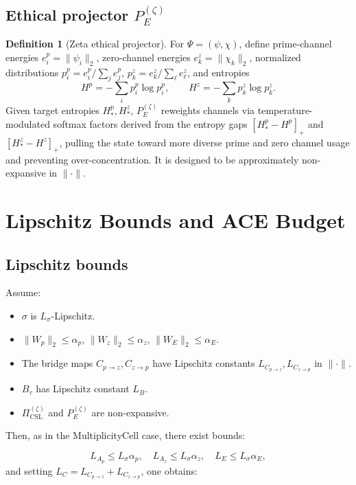 \documentclass[11pt]{article}
\theoremstyle{definition}
\newtheorem{definition}{Definition}
\theoremstyle{plain}
\begin{document}
\subsection{Ethical projector \texorpdfstring{$P_E^{(\zeta)}$}{PEz}}

\begin{definition}[Zeta ethical projector]
For $\Psi=(\psi,\chi)$, define prime-channel energies $e_i^p = \|\psi_i\|_2$, zero-channel energies $e_k^z = \|\chi_k\|_2$, normalized distributions $p^p_i = e_i^p / \sum_j e_j^p$, $p^z_k = e_k^z / \sum_\ell e_\ell^z$, and entropies
\[
  H^p = -\sum_i p^p_i \log p^p_i,
  \qquad
  H^z = -\sum_k p^z_k \log p^z_k.
\]
Given target entropies $H_\ast^p,H_\ast^z$, $P_E^{(\zeta)}$ reweights channels via temperature-modulated softmax factors derived from the entropy gaps $[H_\ast^p-H^p]_+$ and $[H_\ast^z-H^z]_+$, pulling the state toward more diverse prime and zero channel usage and preventing over-concentration.
It is designed to be approximately non-expansive in $\|\cdot\|$.
\end{definition}

\section{Lipschitz Bounds and ACE Budget}

\subsection{Lipschitz bounds}

Assume:

\begin{itemize}[leftmargin=*]
  \item $\sigma$ is $L_\sigma$-Lipschitz.
  \item $\|W_p\|_2 \le \alpha_p$, $\|W_z\|_2 \le \alpha_z$, $\|W_E\|_2 \le \alpha_E$.
  \item The bridge maps $C_{p\to z},C_{z\to p}$ have Lipschitz constants $L_{C_{p\to z}},L_{C_{z\to p}}$ in $\|\cdot\|$.
  \item $B_\tau$ has Lipschitz constant $L_B$.
  \item $\Pi_{\mathrm{CSL}}^{(\zeta)}$ and $P_E^{(\zeta)}$ are non-expansive.
\end{itemize}

Then, as in the MultiplicityCell case, there exist bounds:

\[
  L_{A_p} \le L_\sigma \alpha_p,
  \quad
  L_{A_z} \le L_\sigma \alpha_z,
  \quad
  L_E \le L_\sigma \alpha_E,
\]
and setting $L_C = L_{C_{p\to z}} + L_{C_{z\to p}}$, one obtains:
\end{document}
